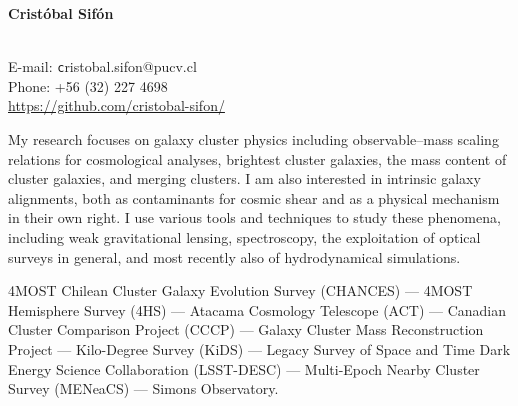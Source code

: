 \documentclass[11pt]{article}
\begin{document}
\begin{minipage}[b]{0.46\linewidth}
\flushleft
\hspace{-0.7cm}
{\bf\huge Crist\'obal Sif\'on}\\\vspace{0.2cm}
\\
\end{minipage}
\begin{minipage}[b]{0.49\linewidth}
\flushright
{\large E-mail: {\texttt cristobal.sifon@pucv.cl}\\
        Phone: +56 (32) 227 4698\\
        \url{https://github.com/cristobal-sifon/}}
\end{minipage}
\vspace{0.4cm}
\hline




My research focuses on galaxy cluster physics including observable--mass scaling 
relations for cosmological analyses, brightest cluster galaxies, the mass 
content of cluster galaxies, and merging clusters. I am also interested in 
intrinsic galaxy alignments, both as contaminants for cosmic shear and as a 
physical mechanism in their own right. I use various tools and techniques to 
study these phenomena, including weak gravitational lensing, spectroscopy, the 
exploitation of optical surveys in general, and most recently also of
hydrodynamical simulations.

\vspace{0.5cm}
{
 4MOST Chilean Cluster Galaxy Evolution Survey (CHANCES) ---
 4MOST Hemisphere Survey (4HS) ---
 Atacama Cosmology Telescope (ACT) ---
 Canadian Cluster Comparison Project (CCCP) ---
 Galaxy Cluster Mass Reconstruction Project ---
 Kilo-Degree Survey (KiDS) ---
 Legacy Survey of Space and Time Dark Energy Science Collaboration (LSST-DESC) ---
 Multi-Epoch Nearby Cluster Survey (MENeaCS) ---
 Simons Observatory.
}
\end{document}
